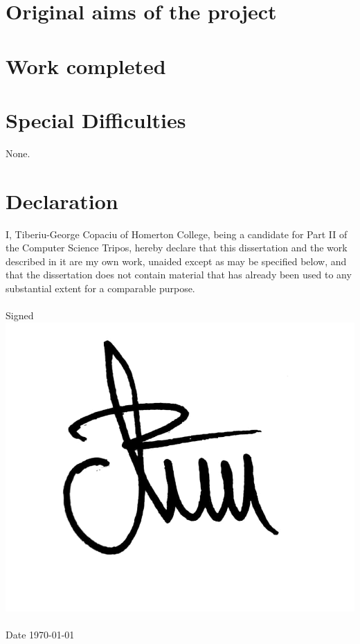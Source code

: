 \documentclass[12pt,a4paper,twoside,openright]{report}
\begin{document}

\section*{Original aims of the project}

\section*{Work completed}

\section*{Special Difficulties}
None.

\newpage
\section*{Declaration}
I, Tiberiu-George Copaciu of Homerton College,
being a candidate for Part II of the Computer Science Tripos,
hereby declare that this dissertation and the work described in it
are my own work, unaided except as may be specified below, and
that the dissertation does not contain material that has already
been used to any substantial extent for a comparable purpose.
\\ \\
Signed
\includegraphics[height=1.5\baselineskip]{Images/signature.jpg}
\\ \\
Date \today
\end{document}
